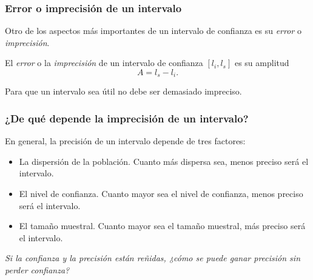 \begin{frame}
\frametitle{Error o imprecisión de un intervalo}
Otro de los aspectos más importantes de un intervalo de confianza es su \emph{error} o \emph{imprecisión}.
\begin{definicion}
El \emph{error} o la \emph{imprecisión} de un intervalo de confianza $[l_i,l_s]$ es su amplitud
\[
A=l_s-l_i.
\]
\end{definicion}

\begin{center}
\end{center}

Para que un intervalo sea útil no debe ser demasiado impreciso.

\end{frame}


\begin{frame}
\frametitle{¿De qué depende la imprecisión de un intervalo?}
En general, la precisión de un intervalo depende de tres factores:
\begin{itemize}
\item La dispersión de la población. Cuanto más dispersa sea, menos preciso será el intervalo.
\item El nivel de confianza. Cuanto mayor sea el nivel de confianza, menos preciso será el intervalo.
\item El tamaño muestral. Cuanto mayor sea el tamaño muestral, más preciso será el intervalo.
\end{itemize}
\begin{center}
\emph{Si la confianza y la precisión están reñidas, ¿cómo se puede ganar precisión sin perder confianza?}
\end{center}
\end{frame}


